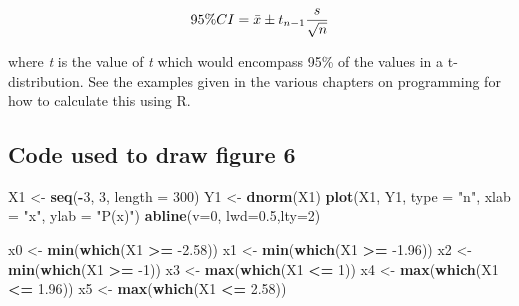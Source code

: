 \documentclass[
]{book}
\newenvironment{Shaded}{\begin{snugshade}}{\end{snugshade}}
\newcommand{\DataTypeTok}[1]{\textcolor[rgb]{0.13,0.29,0.53}{#1}}
\newcommand{\DecValTok}[1]{\textcolor[rgb]{0.00,0.00,0.81}{#1}}
\newcommand{\FloatTok}[1]{\textcolor[rgb]{0.00,0.00,0.81}{#1}}
\newcommand{\KeywordTok}[1]{\textcolor[rgb]{0.13,0.29,0.53}{\textbf{#1}}}
\newcommand{\NormalTok}[1]{#1}
\newcommand{\OperatorTok}[1]{\textcolor[rgb]{0.81,0.36,0.00}{\textbf{#1}}}
\newcommand{\StringTok}[1]{\textcolor[rgb]{0.31,0.60,0.02}{#1}}
\begin{document}
\[\Large 95\% CI = \bar{x} \pm t_{n-1} \frac{s}{\sqrt{n}}\]

where \emph{t} is the value of \emph{t} which would encompass 95\% of the values in a t-distribution. See the examples given in the various chapters on programming for how to calculate this using R.

\hypertarget{code-used-to-draw-figure-6}{%
\subsection{Code used to draw figure 6}\label{code-used-to-draw-figure-6}}

\begin{Shaded}
\begin{Highlighting}[]
\NormalTok{X1 <-}\StringTok{ }\KeywordTok{seq}\NormalTok{(}\OperatorTok{-}\DecValTok{3}\NormalTok{, }\DecValTok{3}\NormalTok{, }\DataTypeTok{length =} \DecValTok{300}\NormalTok{)}
\NormalTok{Y1 <-}\StringTok{ }\KeywordTok{dnorm}\NormalTok{(X1)}
\KeywordTok{plot}\NormalTok{(X1, Y1, }\DataTypeTok{type =} \StringTok{"n"}\NormalTok{, }\DataTypeTok{xlab =} \StringTok{"x"}\NormalTok{, }\DataTypeTok{ylab =} \StringTok{"P(x)"}\NormalTok{)}
\KeywordTok{abline}\NormalTok{(}\DataTypeTok{v=}\DecValTok{0}\NormalTok{, }\DataTypeTok{lwd=}\FloatTok{0.5}\NormalTok{,}\DataTypeTok{lty=}\DecValTok{2}\NormalTok{)}

\NormalTok{x0 <-}\StringTok{ }\KeywordTok{min}\NormalTok{(}\KeywordTok{which}\NormalTok{(X1 }\OperatorTok{>=}\StringTok{ }\FloatTok{-2.58}\NormalTok{))}
\NormalTok{x1 <-}\StringTok{ }\KeywordTok{min}\NormalTok{(}\KeywordTok{which}\NormalTok{(X1 }\OperatorTok{>=}\StringTok{ }\FloatTok{-1.96}\NormalTok{))}
\NormalTok{x2 <-}\StringTok{ }\KeywordTok{min}\NormalTok{(}\KeywordTok{which}\NormalTok{(X1 }\OperatorTok{>=}\StringTok{ }\DecValTok{-1}\NormalTok{))}
\NormalTok{x3 <-}\StringTok{ }\KeywordTok{max}\NormalTok{(}\KeywordTok{which}\NormalTok{(X1 }\OperatorTok{<=}\StringTok{ }\DecValTok{1}\NormalTok{))}
\NormalTok{x4 <-}\StringTok{ }\KeywordTok{max}\NormalTok{(}\KeywordTok{which}\NormalTok{(X1 }\OperatorTok{<=}\StringTok{ }\FloatTok{1.96}\NormalTok{))}
\NormalTok{x5 <-}\StringTok{ }\KeywordTok{max}\NormalTok{(}\KeywordTok{which}\NormalTok{(X1 }\OperatorTok{<=}\StringTok{ }\FloatTok{2.58}\NormalTok{))}


\end{Highlighting}
\end{Shaded}
\end{document}
